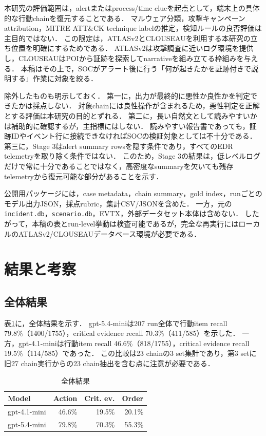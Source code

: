 \documentclass[dvipdfmx]{FITpaper}
\newcommand{\model}[1]{\mbox{\textrm{#1}}}
\begin{document}
本研究の評価範囲は，alertまたはprocess/time clueを起点として，端末上の具体的な行動chainを復元することである．
マルウェア分類，攻撃キャンペーン attribution，MITRE ATT\&CK technique labelの推定，検知ルールの良否評価は主目的ではない．
この限定は，ATLASv2とCLOUSEAUを利用する本研究の立ち位置を明確にするためである．
ATLASv2は攻撃調査に近いログ環境を提供し，CLOUSEAUはPOIから証跡を探索してnarrativeを組み立てる枠組みを与える．
本稿はその上で，SOCがアラート後に行う「何が起きたかを証跡付きで説明する」作業に対象を絞る．

除外したものも明示しておく．
第一に，出力が最終的に悪性か良性かを判定できたかは採点しない．
対象chainには良性操作が含まれるため，悪性判定を正解とする評価は本研究の目的とずれる．
第二に，長い自然文として読みやすいかは補助的に確認するが，主指標にはしない．
読みやすい報告書であっても，証跡IDやイベント行に接続できなければSOCの検証対象としては不十分である．
第三に，Stage 3はalert summary rowsを隠す条件であり，すべてのEDR telemetryを取り除く条件ではない．
このため，Stage 3の結果は，低レベルログだけで常に十分であることではなく，高密度なsummaryを欠いても残存telemetryから復元可能な部分があることを示す．

公開用パッケージには，case metadata，chain summary，gold index，runごとのモデル出力JSON，採点rubric，集計CSV/JSONを含めた．
一方，元の\texttt{incident.db}，\texttt{scenario.db}，EVTX，外部データセット本体は含めない．
したがって，本稿の表とrun-level挙動は検査可能であるが，完全な再実行にはローカルのATLASv2/CLOUSEAUデータベース環境が必要である．



\section{結果と考察}

\subsection{全体結果}

表\ref{table:overall}に，全体結果を示す．
\model{gpt-5.4-mini}は207 run全体で行動item recall 79.8\%（1400/1755），critical evidence recall 70.3\%（411/585）を示した．
一方，\model{gpt-4.1-mini}は行動item recall 46.6\%（818/1755），critical evidence recall 19.5\%（114/585）であった．
この比較は23 chainの3 set集計であり，第3 setに旧27 chain実行からの23 chain抽出を含む点に注意が必要である．

\begin{table}[ht]
    \centering
    \caption{全体結果}
    \label{table:overall}
    \begin{tabular}{lrrr}
        \toprule
        Model & Action & Crit. ev. & Order \\
        \midrule
        \model{gpt-4.1-mini} & 46.6\% & 19.5\% & 20.1\% \\
        \model{gpt-5.4-mini} & 79.8\% & 70.3\% & 55.3\% \\
        \bottomrule
    \end{tabular}
\end{table}
\end{document}
